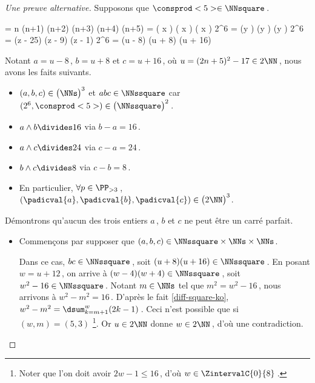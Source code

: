 \begin{proof}[Une preuve alternative]%
    Supposons que $\consprod<5> \in \NNsquare$\,.

    \medskip
    \begin{stepcalc}[style = ar*, ope = \iff]
    	 = 
			n (n+1) (n+2) (n+3) (n+4) (n+5)
    	\consprod<5> = 
			\big( x \pm {} \big) \big( x \pm {} \big) \big( x \pm {} \big) 
    	2^6 \consprod<5> = 
			(y ) (y ) (y )
    	2^6 \consprod<5> = 
			(z - 25) (z - 9) (z - 1) 
    	2^6 \consprod<5> = 
			(u - 8) (u + 8) (u + 16)
    \end{stepcalc}

    \medskip
    Notant $a = u - 8$\,, $b = u + 8$ et $c = u + 16$\,, où $u = (2 n + 5)^2 - 17 \in 2 \NN$\,, nous avons les faits suivants.
    
    \begin{itemize}
		\item $(a, b, c) \in \big( \NNs \big)^3$ et $abc \in \NNssquare$ car $(2^6, \consprod<5>) \in \big( \NNssquare \big)^2$\,.

		\item $a \wedge b \divides 16$ via $b - a = 16$\,.

		\item $a \wedge c \divides 24$ via $c - a = 24$\,.

		\item $b \wedge c \divides 8$  via $c - b = 8$\,.

		\item En particulier, 
		$\forall p \in \PP_{>3}$\,, 
		$(\padicval{a}, \padicval{b}, \padicval{c}) \in \big( 2 \NN \big)^3$.
	\end{itemize}

	
	Démontrons qu'aucun des trois entiers $a$\,, $b$ et $c$ ne peut être un carré parfait.
	\begin{itemize}
		\medskip
		\item Commençons par supposer que $(a, b, c) \in \NNssquare \times \NNs \times \NNs$. 
		
		\smallskip
		\noindent
		Dans ce cas, $bc \in \NNssquare$\,, soit $(u + 8) (u + 16) \in \NNssquare$\,.
		En posant $w = u + 12$\,, on arrive à $(w - 4) (w + 4) \in \NNssquare$\,, soit $w^2 - 16 \in \NNssquare$\,.
		Notant $m \in \NNs$ tel que $m^2 = w^2 - 16$\,, nous arrivons à $w^2 - m^2 = 16$\,.
		D'après le fait \ref{diff-square-ko}, $w^2 - m^2 = \dsum_{k=m+1}^{w} (2 k - 1)$\,.
		Ceci n'est possible que si $(w, m) = (5, 3)$
		\footnote{
			Noter que l'on doit avoir $2 w - 1 \leq 16$\,, d'où $w \in \ZintervalC{0}{8}$\,.
		}.
		Or $u \in 2 \NN$ donne $w \in 2 \NN$\,, d'où une contradiction.		
		

\end{itemize}
\end{proof}
